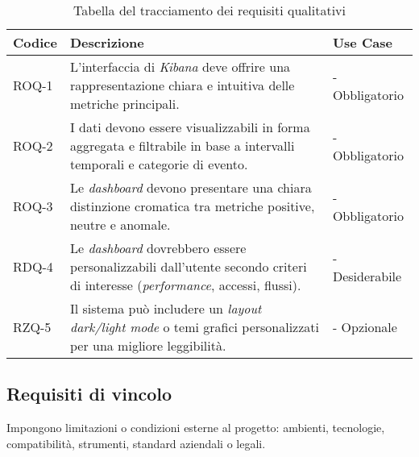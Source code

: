\begin{table}[h]
\caption{Tabella del tracciamento dei requisiti qualitativi}
\label{tab:requisiti-qualitativi}
\begin{tabularx}{\textwidth}{lXl}
\hline
\rowcolor[gray]{0.8}
\textbf{Codice} & \textbf{Descrizione} & \textbf{Use Case}\\
\hline
ROQ-1    & L'interfaccia di \emph{Kibana} deve offrire una rappresentazione chiara e intuitiva delle metriche principali. & - Obbligatorio \\
\hline

\hline
ROQ-2    & I dati devono essere visualizzabili in forma aggregata e filtrabile in base a intervalli temporali e categorie di evento. & - Obbligatorio\\
\hline

\hline
ROQ-3    & Le \emph{dashboard} devono presentare una chiara distinzione cromatica tra metriche positive, neutre e anomale. & - Obbligatorio\\
\hline

\hline
RDQ-4    & Le \emph{dashboard} dovrebbero essere personalizzabili dall'utente secondo criteri di interesse (\emph{performance}, accessi, flussi). & - Desiderabile \\
\hline

\hline
RZQ-5    & Il sistema può includere un \emph{layout dark/light mode} o temi grafici personalizzati per una migliore leggibilità. & - Opzionale \\
\hline

\end{tabularx}
\end{table}%

\newpage
\subsection{Requisiti di vincolo}
Impongono limitazioni o condizioni esterne al progetto: ambienti, tecnologie, compatibilità, strumenti, standard aziendali o legali.

